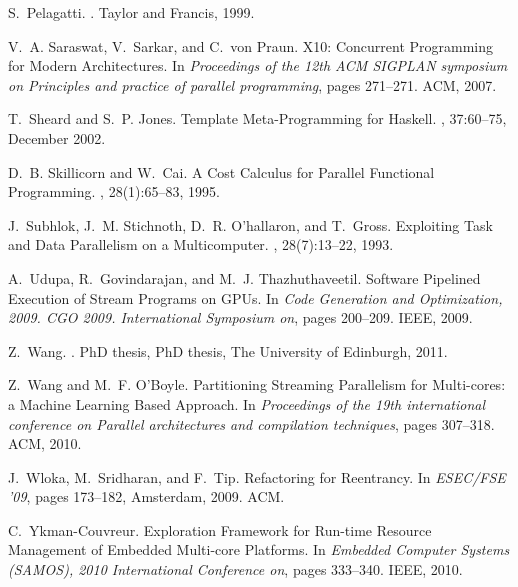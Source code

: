 \documentclass[smallextended]{svjour3}
\begin{document}
\begin{thebibliography}{10}
S.~Pelagatti.
.
\newblock Taylor and Francis, 1999.

V.~A. Saraswat, V.~Sarkar, and C.~von Praun.
\newblock X10: Concurrent Programming for Modern Architectures.
\newblock In {\em Proceedings of the 12th ACM SIGPLAN symposium on Principles
  and practice of parallel programming}, pages 271--271. ACM, 2007.

T.~Sheard and S.~P. Jones.
\newblock Template {M}eta-{P}rogramming for {H}askell.
, 37:60--75, December 2002.

D.~B. Skillicorn and W.~Cai.
\newblock A {C}ost {C}alculus for {P}arallel {F}unctional {P}rogramming.
, 28(1):65--83, 1995.

J.~Subhlok, J.~M. Stichnoth, D.~R. O'hallaron, and T.~Gross.
\newblock Exploiting Task and Data Parallelism on a Multicomputer.
, 28(7):13--22, 1993.

A.~Udupa, R.~Govindarajan, and M.~J. Thazhuthaveetil.
\newblock Software Pipelined Execution of Stream Programs on GPUs.
\newblock In {\em Code Generation and Optimization, 2009. CGO 2009.
  International Symposium on}, pages 200--209. IEEE, 2009.

Z.~Wang.
.
\newblock PhD thesis, PhD thesis, The University of Edinburgh, 2011.

Z.~Wang and M.~F. O'Boyle.
\newblock Partitioning Streaming Parallelism for Multi-cores: a Machine
  Learning Based Approach.
\newblock In {\em Proceedings of the 19th international conference on Parallel
  architectures and compilation techniques}, pages 307--318. ACM, 2010.

J.~Wloka, M.~Sridharan, and F.~Tip.
\newblock Refactoring for Reentrancy.
\newblock In {\em ESEC/FSE '09}, pages 173--182, Amsterdam, 2009. ACM.

C.~Ykman-Couvreur.
\newblock Exploration Framework for Run-time Resource Management of Embedded
  Multi-core Platforms.
\newblock In {\em Embedded Computer Systems (SAMOS), 2010 International
  Conference on}, pages 333--340. IEEE, 2010.


\end{thebibliography}
\end{document}
